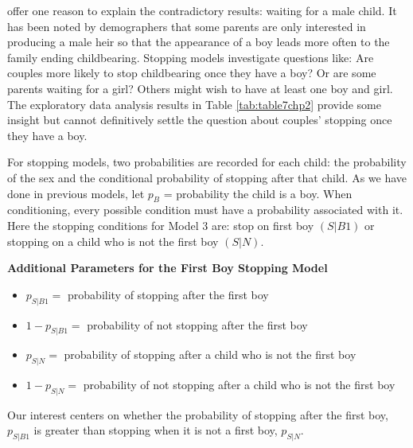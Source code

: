 \documentclass[
]{krantz}
\providecommand{\tightlist}{%
  \setlength{\itemsep}{0pt}\setlength{\parskip}{0pt}}
\newcommand{\bstop}{p_{S|B1}}
\newcommand{\nstop}{p_{S|N}}
\begin{document}
\citet{Rodgers2001} offer one reason to explain the contradictory results: waiting for a male child. It has been noted by demographers that some parents are only interested in producing a male heir so that the appearance of a boy leads more often to the family ending childbearing. Stopping models investigate questions like: Are couples more likely to stop childbearing once they have a boy? Or are some parents waiting for a girl? Others might wish to have at least one boy and girl. The exploratory data analysis results in Table \ref{tab:table7chp2} provide some insight but cannot definitively settle the question about couples' stopping once they have a boy.

For stopping models, two probabilities are recorded for each child: the probability of the sex and the conditional probability of stopping after that child. As we have done in previous models, let \(p_B\) = probability the child is a boy. When conditioning, every possible condition must have a probability associated with it. Here the stopping conditions for Model 3 are: stop on first boy \((S|B1)\) or stopping on a child who is not the first boy \((S|N)\).

\textbf{Additional Parameters for the First Boy Stopping Model}

\begin{itemize}
\tightlist
\item
  \(\bstop =\) probability of stopping after the first boy
\item
  \(1 - \bstop =\) probability of not stopping after the first boy
\item
  \(\nstop =\) probability of stopping after a child who is not the first boy
\item
  \(1 - \nstop =\) probability of not stopping after a child who is not the first boy
\end{itemize}

Our interest centers on whether the probability of stopping after the first boy, \(\bstop\) is greater than stopping when it is not a first boy, \(\nstop\).
\end{document}

